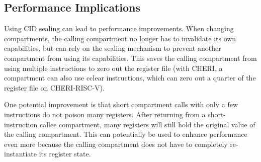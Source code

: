 \subsection{Performance Implications}

Using CID sealing can lead to performance improvements.
When changing compartments, the calling compartment no longer has to invalidate its own capabilities, but can rely on the sealing mechanism to prevent another compartment from using its capabilities.
This saves the calling compartment from using multiple instructions to zero out the register file (with CHERI, a compartment can also use cclear instructions, which can zero out a quarter of the register file on CHERI-RISC-V).

One potential improvement is that short compartment calls with only a few instructions do not poison many registers.
After returning from a short-instruction callee compartment, many registers will still hold the original value of the calling compartment.
This can potentially be used to enhance performance even more because the calling compartment does not have to completely re-instantiate its register state.
